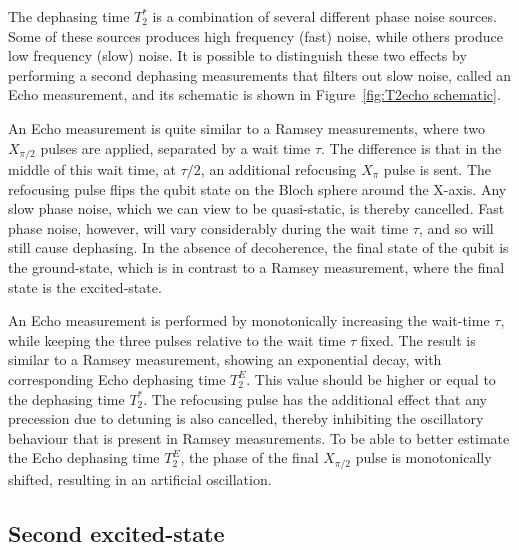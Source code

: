           The dephasing time $T_2^*$ is a combination of several different phase noise sources. Some of these sources produces high frequency (fast) noise, while others produce low frequency (slow) noise. It is possible to distinguish these two effects by performing a second dephasing measurements that filters out slow noise, called an Echo measurement, and its schematic is shown in Figure~\ref{fig:T2echo schematic}.

          An Echo measurement is quite similar to a Ramsey measurements, where two $X_{\pi/2}$ pulses are applied, separated by a wait time $\tau$. The difference is that in the middle of this wait time, at $\tau/2$, an additional refocusing $X_{\pi}$ pulse is sent. The refocusing pulse flips the qubit state on the Bloch sphere around the X-axis. Any slow phase noise, which we can view to be quasi-static, is thereby cancelled. Fast phase noise, however, will vary considerably during the wait time $\tau$, and so will still cause dephasing. In the absence of decoherence, the final state of the qubit is the ground-state, which is in contrast to a Ramsey measurement, where the final state is the excited-state.

          An Echo measurement is performed by monotonically increasing the wait-time $\tau$, while keeping the three pulses relative to the wait time $\tau$ fixed. The result is similar to a Ramsey measurement, showing an exponential decay, with corresponding Echo dephasing time $T_2^E$. This value should be higher or equal to the dephasing time $T_2^*$. The refocusing pulse has the additional effect that any precession due to detuning is also cancelled, thereby inhibiting the oscillatory behaviour that is present in Ramsey measurements. To be able to better estimate the Echo dephasing time $T_2^E$, the phase of the final $X_{\pi/2}$ pulse is monotonically shifted, resulting in an artificial oscillation.

      \subsection{Second excited-state}
        \label{ssec:Second excited-state}

